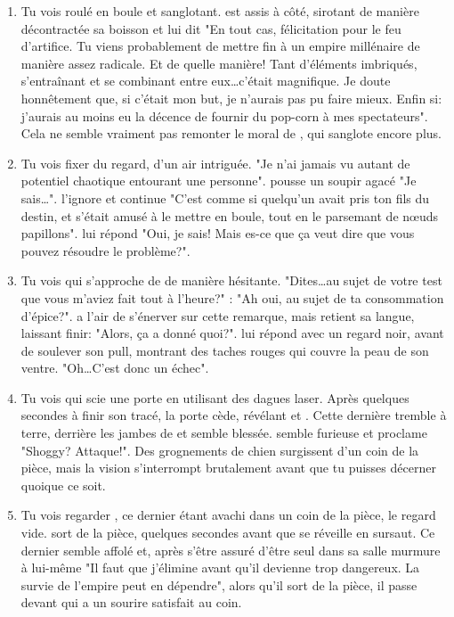 {\begin{enumerate}
		\item Tu vois \nmPlayerXI roulé en boule et sanglotant. \nmPlayerIV est assis à côté, sirotant de manière décontractée sa boisson et lui dit "En tout cas, félicitation pour le feu d'artifice. Tu viens probablement de mettre fin à un empire millénaire de manière assez radicale. Et de quelle manière! Tant d'éléments imbriqués, s'entraînant et se combinant entre eux\dots c'était magnifique. Je doute honnêtement que, si c'était mon but, je n'aurais pas pu faire mieux. Enfin si: j'aurais au moins eu la décence de fournir du pop-corn à mes spectateurs". Cela ne semble vraiment pas remonter le moral de \nmPlayerXI, qui sanglote encore plus.
		
		\item Tu vois \nmPlayerIX fixer \nmPlayerXI du regard, d'un air intriguée. "Je n'ai jamais vu autant de potentiel chaotique entourant une personne". \nmPlayerXI pousse un soupir agacé "Je sais\dots". \nmPlayerIX l'ignore et continue "C'est comme si quelqu'un avait pris ton fils du destin, et s'était amusé à le mettre en boule, tout en le parsemant de nœuds papillons". \nmPlayerXI lui répond "Oui, je sais! Mais es-ce que ça veut dire que vous pouvez résoudre le problème?".
		
		\item Tu vois \nmPlayerIII qui s'approche de \nmPlayerXII de manière hésitante. "Dites\dots au sujet de votre test que vous m'aviez fait tout à l'heure?" \nmPlayerXII: "Ah oui, au sujet de ta consommation d'épice?". \nmPlayerIII a l'air de s'énerver sur cette remarque, mais retient sa langue, laissant \nmPlayerXII finir: "Alors, ça a donné quoi?". \nmPlayerIII lui répond avec un regard noir, avant de soulever son pull, montrant des taches rouges qui couvre la peau de son ventre. "Oh\dots C'est donc un échec".
		
		
		\item Tu vois \nmPlayerX qui scie une porte en utilisant des dagues laser. Après quelques secondes à finir son tracé, la porte cède, révélant \nmPlayerVI et \nmPlayerIX. Cette dernière tremble à terre, derrière les jambes de \nmPlayerVI et semble blessée. \nmPlayerVI semble furieuse et proclame "Shoggy? Attaque!". Des grognements de chien surgissent d'un coin de la pièce, mais la vision s'interrompt brutalement avant que tu puisses décerner quoique ce soit.
		
		\item Tu vois \nmPlayerIX regarder \nmPlayerVIII, ce dernier étant avachi dans un coin de la pièce, le regard vide. \nmPlayerIX sort de la pièce, quelques secondes avant que \nmPlayerVIII se réveille en sursaut. Ce dernier semble affolé et, après s'être assuré d'être seul dans sa salle murmure à lui-même "Il faut que j'élimine \nmPlayerX avant qu'il devienne trop dangereux. La survie de l'empire peut en dépendre", alors qu'il sort de la pièce, il passe devant \nmPlayerIX qui a un sourire satisfait au coin.
		

\end{enumerate}}
